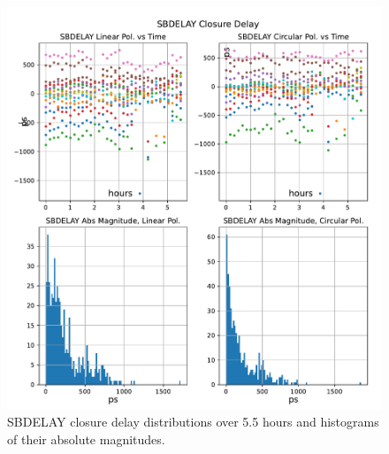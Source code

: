 \documentclass[letterpaper,twoside,12pt]{article}
\begin{document}
\begin{figure}[ht!]
  \begin{center}
  \includegraphics[width=40pc]{SBDELAY_Closure_Delay.pdf}
  \caption{\small SBDELAY closure delay distributions over 5.5 hours and histograms of their absolute magnitudes.}
  \label{sbd}
  \end{center}
\end{figure}
\end{document}

